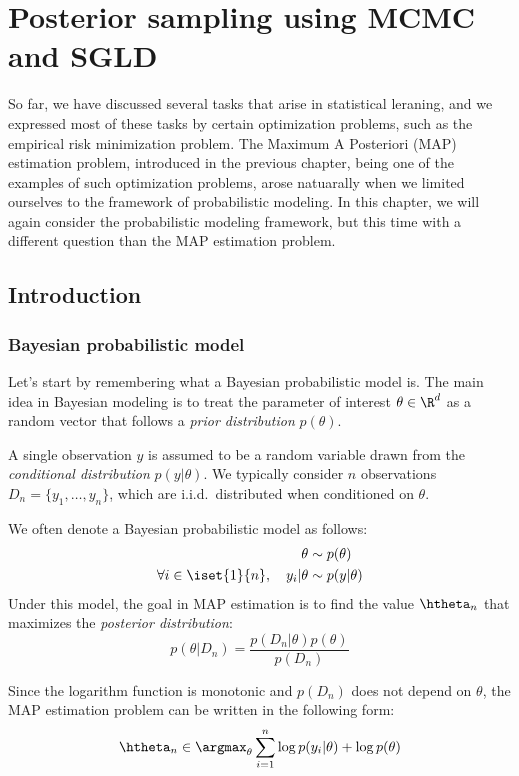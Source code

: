 \documentclass[toc, titlepaged]{../cs-classes/cs-classes}
\begin{document}
\section{Posterior sampling using MCMC and SGLD}
So far, we have discussed several tasks that arise in statistical leraning, and we expressed most of these tasks by certain optimization problems, such as the empirical risk minimization problem. The Maximum A Posteriori (MAP) estimation problem, introduced in the previous chapter, being one of the examples of such optimization problems, arose natuarally when we limited ourselves to the framework of probabilistic modeling. In this chapter, we will again consider the probabilistic modeling framework, but this time with a different question than the MAP estimation problem.

\subsection{Introduction}
\subsubsection{Bayesian probabilistic model}
Let's start by remembering what a Bayesian probabilistic model is. The main idea in Bayesian modeling is to treat the parameter of interest $\theta\in\R^d$ as a random vector that follows a \emph{prior distribution} $p(\theta)$. 

A single observation $y$ is assumed to be a random variable drawn from the \emph{conditional distribution} $p(y|\theta)$. We typically consider $n$ observations $D_n=\{y_1, \dots, y_n\}$, which are i.i.d.~distributed when conditioned on $\theta$. 

We often denote a Bayesian probabilistic model as follows:
\begin{equation}
    \begin{aligned}
        \theta&\sim p(\theta)\\
        \forall i\in\iset{1}{n}, \quad y_i|\theta&\sim p(y|\theta)
    \end{aligned}
\end{equation}
Under this model, the goal in MAP estimation is to find the value $\htheta_n$ that maximizes the \emph{posterior distribution}:
\begin{equation}
    p(\theta|D_n) = \frac{p(D_n|\theta)p(\theta)}{p(D_n)}
\end{equation}

Since the logarithm function is monotonic and $p(D_n)$ does not depend on $\theta$, the MAP estimation problem can be written in the following form:
\begin{equation}
    \htheta_n\in\argmax_\theta \sum_{i=1}^n\log p(y_i|\theta)+\log p(\theta)
\end{equation}
\end{document}
